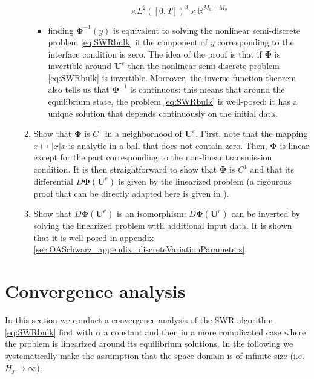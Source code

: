 \begin{enumerate}
\begin{enumerate}
\begin{itemize}
\begin{equation}
 			\times L^2([0,T])^{3}
			\times \mathbb{R}^{M_a+M_o}
 	\end{equation}
\item 
finding $\mathbf{\Phi}^{-1}(y)$ is equivalent
to solving the nonlinear semi-discrete problem
\eqref{eq:SWRbulk} if the component of $y$ corresponding
to the interface condition is zero.
The idea of the proof is that if $\mathbf{\Phi}$ is invertible
around $\mathbf{U}^e$ then the nonlinear semi-discrete problem
\eqref{eq:SWRbulk} is invertible.
Moreover, the inverse function theorem also tells us that
$\mathbf{\Phi}^{-1}$ is continuous:
this means that around
the equilibrium state, the problem \eqref{eq:SWRbulk} is well-posed:
it has a unique solution that depends continuously
on the initial data.
\end{itemize}
	\item Show that $\mathbf{\Phi}$ is $C^1$ in a
		neighborhood of $\mathbf{U}^e$.
		First, note that the mapping
		$x \mapsto |x|x$ is analytic in a
		ball that does not contain zero.
		Then, $\mathbf{\Phi}$ is linear
		except for the part corresponding
		to the non-linear transmission condition.
		It is then straightforward to show that
		$\mathbf{\Phi}$ is $C^1$ and that
		its differential
		$D\mathbf{\Phi}(\mathbf{U}^e)$ is given
		by the linearized problem (a rigourous
		proof that can be directly adapted here
		is given in \cite{chacon-rebollo_existence_2014}).
		\item Show that $D\mathbf{\Phi}(\mathbf{U}^e)$
		is an isomorphism:
		$D\mathbf{\Phi}(\mathbf{U}^e)$ can
		be inverted by solving the linearized problem
		with additional input data.
		It is shown
		that it is well-posed in appendix
		\ref{sec:OASchwarz_appendix_discreteVariationParameters}.
	\end{enumerate}
\end{enumerate}

\section{Convergence analysis} \label{sec:conv-lin}
In this section we conduct a convergence analysis of the SWR algorithm 
\eqref{eq:SWRbulk} first with $\alpha$ a constant and then in a more 
complicated case where the problem is linearized around its 
equilibrium solutions. In the following we systematically make the assumption 
that the space domain is of infinite size (i.e. $H_j\to\infty$).
